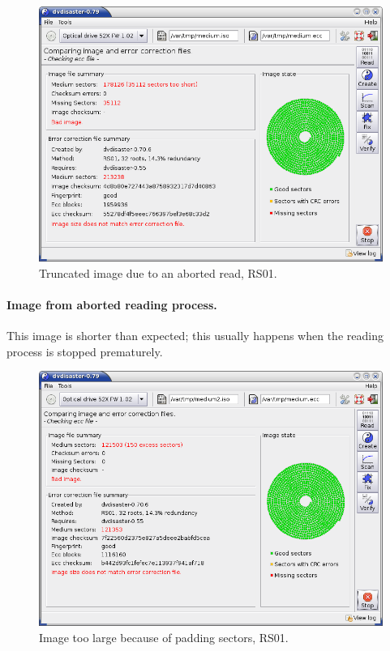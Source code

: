 \begin{figure}[h]
\centerline{\includegraphics[width=\textwidth]{screenshots/info-truncated.png}}
\caption{Truncated image due to an aborted read, RS01.}
\label{howto-info-truncated}
\end{figure}

\paragraph{\bf Image from aborted reading process.} This image is shorter
than expected; this usually happens when the reading process is stopped prematurely. 

\newpage

\begin{figure}[h]
\centerline{\includegraphics[width=\textwidth]{screenshots/info-padding.png}}
\caption{Image too large because of padding sectors, RS01.}
\label{howto-info-padding}
\end{figure}

